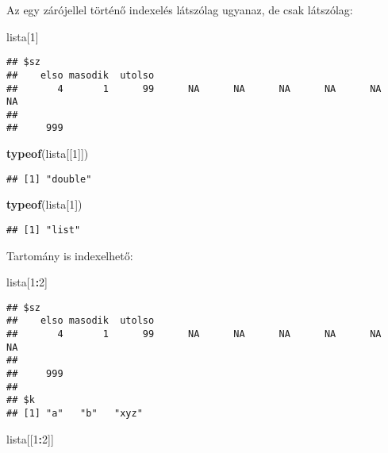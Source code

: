 \documentclass[]{book}
\newenvironment{Shaded}{\begin{snugshade}}{\end{snugshade}}
\newcommand{\DecValTok}[1]{\textcolor[rgb]{0.00,0.00,0.81}{#1}}
\newcommand{\KeywordTok}[1]{\textcolor[rgb]{0.13,0.29,0.53}{\textbf{#1}}}
\newcommand{\NormalTok}[1]{#1}
\newcommand{\OperatorTok}[1]{\textcolor[rgb]{0.81,0.36,0.00}{\textbf{#1}}}
\begin{document}
Az egy zárójellel történő indexelés látszólag ugyanaz, de csak látszólag:

\begin{Shaded}
\begin{Highlighting}[]
\NormalTok{lista[}\DecValTok{1}\NormalTok{]}
\end{Highlighting}
\end{Shaded}

\begin{verbatim}
## $sz
##    elso masodik  utolso                                                 
##       4       1      99      NA      NA      NA      NA      NA      NA 
##         
##     999
\end{verbatim}

\begin{Shaded}
\begin{Highlighting}[]
\KeywordTok{typeof}\NormalTok{(lista[[}\DecValTok{1}\NormalTok{]])}
\end{Highlighting}
\end{Shaded}

\begin{verbatim}
## [1] "double"
\end{verbatim}

\begin{Shaded}
\begin{Highlighting}[]
\KeywordTok{typeof}\NormalTok{(lista[}\DecValTok{1}\NormalTok{])}
\end{Highlighting}
\end{Shaded}

\begin{verbatim}
## [1] "list"
\end{verbatim}

Tartomány is indexelhető:

\begin{Shaded}
\begin{Highlighting}[]
\NormalTok{lista[}\DecValTok{1}\OperatorTok{:}\DecValTok{2}\NormalTok{]}
\end{Highlighting}
\end{Shaded}

\begin{verbatim}
## $sz
##    elso masodik  utolso                                                 
##       4       1      99      NA      NA      NA      NA      NA      NA 
##         
##     999 
## 
## $k
## [1] "a"   "b"   "xyz"
\end{verbatim}

\begin{Shaded}
\begin{Highlighting}[]
\NormalTok{lista[[}\DecValTok{1}\OperatorTok{:}\DecValTok{2}\NormalTok{]]}
\end{Highlighting}
\end{Shaded}
\end{document}
